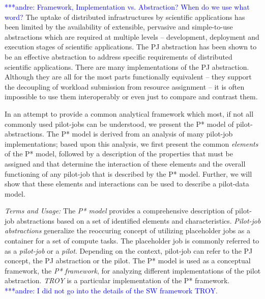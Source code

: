 \documentclass[conference,final]{IEEEtran}
\newcommand{\alnote}[1]{ {\textcolor{blue} { ***andre: #1 }}}
\newcommand{\alnote}[1]{}
\begin{document}


\alnote{Framework, Implementation vs. Abstraction? When do we use what word?}
The uptake of distributed infrastructures by scientific applications has been
limited by the availability of extensible, pervasive and simple-to-use
abstractions which are required at multiple levels – development, deployment and
execution stages of scientific applications. The PJ abstraction has been shown
to be an effective abstraction to address specific requirements of distributed
scientific applications. There are many implementations of the PJ abstraction. 
Although they are all for the most parts functionally equivalent -- they
support the decoupling of workload submission from resource assignment -- it is
often impossible to use them interoperably or even just to compare and contrast
them. 

In an attempt to provide a common analytical framework which most, if not all
commonly used pilot-jobs can be understood, we present the P* model of
pilot-abstractions. The P* model is derived from
an analysis of many pilot-job implementations; based upon this analysis, we
first present the common {\it elements} of the P* model, followed by a
description of the properties that must be assigned and that determine the
interaction of these elements and the overall functioning of any pilot-job that
is described by the P* model. Further, we will show that these elements and
interactions can be used to describe a pilot-data model.

\emph{Terms and Usage:} The \emph{P* model} provides a comprehensive description
of pilot-job abstractions based on a set of identified elements and
characteristics. \emph{Pilot-job abstractions} generalize the reoccuring concept
of utilizing placeholder jobs as a container for a set of compute tasks. The
placeholder job is commonly referred to as a \emph{pilot-job} or a \emph{pilot}.
Depending on the context, pilot-job can refer to the PJ concept, the PJ
abstraction or the pilot. The P* model is used as a conceptual framework, the
\emph{P* framework}, for analyzing different implementations of the pilot
abstraction. \emph{TROY} is a particular implementation of the P*
framework.\alnote{I did not go into the details of the SW framework TROY.}
\end{document}
